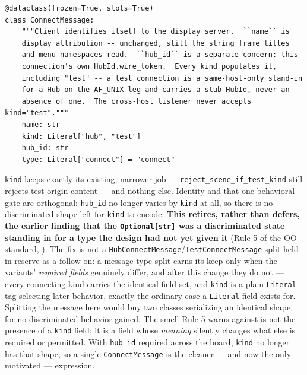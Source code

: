 \documentclass[a4paper,10pt]{article}
\newcommand{\msg}[1]{\texttt{#1}}
\newcommand{\field}[1]{\texttt{#1}}
\begin{document}
\begin{lstlisting}
@dataclass(frozen=True, slots=True)
class ConnectMessage:
    """Client identifies itself to the display server.  ``name`` is
    display attribution -- unchanged, still the string frame titles
    and menu namespaces read.  ``hub_id`` is a separate concern: this
    connection's own HubId.wire_token.  Every kind populates it,
    including "test" -- a test connection is a same-host-only stand-in
    for a Hub on the AF_UNIX leg and carries a stub HubId, never an
    absence of one.  The cross-host listener never accepts kind="test"."""
    name: str
    kind: Literal["hub", "test"]
    hub_id: str
    type: Literal["connect"] = "connect"
\end{lstlisting}

\field{kind} keeps exactly its existing, narrower job ---
\field{reject\_scene\_if\_test\_kind} still rejects test-origin content ---
and nothing else.  Identity and that one behavioral gate are orthogonal:
\field{hub\_id} no longer varies by \field{kind} at all, so there is no
discriminated shape left for \field{kind} to encode.  \textbf{This retires,
rather than defers, the earlier finding that the \texttt{Optional[str]}
was a discriminated state standing in for a type the design had not yet
given it} (Rule 5 of the OO standard, ).  The
fix is not a \texttt{HubConnectMessage}/\texttt{TestConnectMessage} split
held in reserve as a follow-on: a message-type split earns its keep only
when the variants' \emph{required fields} genuinely differ, and after this
change they do not --- every connecting kind carries the identical field
set, and \field{kind} is a plain \texttt{Literal} tag selecting later
behavior, exactly the ordinary case a \texttt{Literal} field exists for.
Splitting the message here would buy two classes serializing an identical
shape, for no discriminated behavior gained.  The smell Rule 5 warns
against is not the presence of a \field{kind} field; it is a field whose
\emph{meaning} silently changes what else is required or permitted.  With
\field{hub\_id} required across the board, \field{kind} no longer has that
shape, so a single \msg{ConnectMessage} is the cleaner --- and now the
only motivated --- expression.
\end{document}
